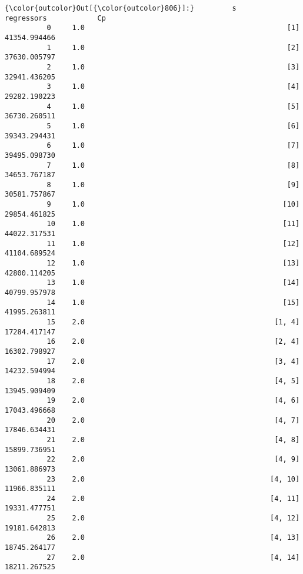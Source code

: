 \documentclass[11pt]{article}
\begin{document}
\begin{Verbatim}[commandchars=\\\{\}]
{\color{outcolor}Out[{\color{outcolor}806}]:}         s                                         regressors            Cp
          0     1.0                                                [1]  41354.994466
          1     1.0                                                [2]  37630.005797
          2     1.0                                                [3]  32941.436205
          3     1.0                                                [4]  29282.190223
          4     1.0                                                [5]  36730.260511
          5     1.0                                                [6]  39343.294431
          6     1.0                                                [7]  39495.098730
          7     1.0                                                [8]  34653.767187
          8     1.0                                                [9]  30581.757867
          9     1.0                                               [10]  29854.461825
          10    1.0                                               [11]  44022.317531
          11    1.0                                               [12]  41104.689524
          12    1.0                                               [13]  42800.114205
          13    1.0                                               [14]  40799.957978
          14    1.0                                               [15]  41995.263811
          15    2.0                                             [1, 4]  17284.417147
          16    2.0                                             [2, 4]  16302.798927
          17    2.0                                             [3, 4]  14232.594994
          18    2.0                                             [4, 5]  13945.909409
          19    2.0                                             [4, 6]  17043.496668
          20    2.0                                             [4, 7]  17846.634431
          21    2.0                                             [4, 8]  15899.736951
          22    2.0                                             [4, 9]  13061.886973
          23    2.0                                            [4, 10]  11966.835111
          24    2.0                                            [4, 11]  19331.477751
          25    2.0                                            [4, 12]  19181.642813
          26    2.0                                            [4, 13]  18745.264177
          27    2.0                                            [4, 14]  18211.267525

\end{Verbatim}
\end{document}
